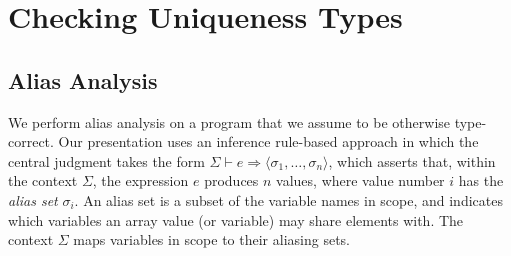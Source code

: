 
\section{Checking Uniqueness Types}

\subsection{Alias Analysis}

\newcommand{\expAliases}[3]{#1 \vdash #2 \Rightarrow #3}
\newcommand{\bodyAliases}[3]{#1 \vdash_{b} #2 \Rightarrow #3}
\newcommand{\aliases}[1]{\textrm{aliases}(#1)}
\newcommand{\seqOccurences}[3]{#1 \gg #2 : #3}

We perform alias analysis on a program that we assume to be otherwise
type-correct.  Our presentation uses an inference rule-based approach
in which the central judgment takes the form %
$\expAliases{\Sigma}{e}{\langle \sigma_{1}, \ldots, \sigma_{n} \rangle}$, which
asserts that, within the context $\Sigma$, the
expression $e$ produces $n$ values, where value number $i$ has the
\textit{alias set} $\sigma_{i}$.  An alias set is a subset of the
variable names in scope, and indicates which variables an array value
(or variable) may share elements with.
The context $\Sigma$ maps variables in scope
to their aliasing sets.

